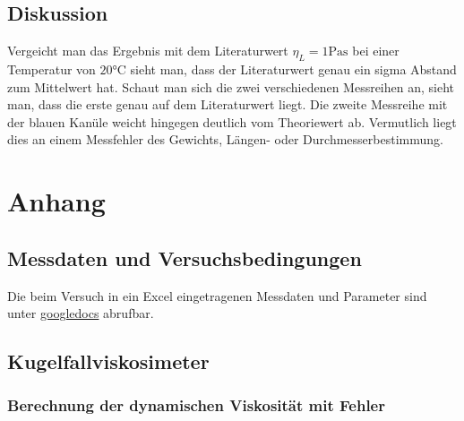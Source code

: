\documentclass[11pt, a4paper]{article}
\begin{document}
    \subsection{Diskussion}
    Vergeicht man das Ergebnis mit dem Literaturwert $\eta_L = 1 \si{\pascal\second}$ \cite[Abb. 8]{VIS} bei einer Temperatur
    von $20 \si{\celsius}$ sieht man, dass der Literaturwert genau ein sigma Abstand zum Mittelwert hat.
    Schaut man sich die zwei verschiedenen Messreihen an, sieht man, dass die erste genau auf dem Literaturwert
    liegt. Die zweite Messreihe mit der blauen Kanüle weicht hingegen deutlich vom Theoriewert ab.
    Vermutlich liegt dies an einem Messfehler des Gewichts, Längen-
    oder Durchmesserbestimmung. 



    \section{Anhang}
    \subsection{Messdaten und Versuchsbedingungen}

    Die beim Versuch in ein Excel eingetragenen Messdaten und Parameter sind unter \href{https://docs.google.com/spreadsheets/d/1p4tOhVyQVlxAsk8v-plbdhuA5Eo4l6K67Ajpn9mxlY4/edit?usp=sharing}{googledocs} abrufbar.

    \subsection{Kugelfallviskosimeter}

    \subsubsection{Berechnung der dynamischen Viskosität mit Fehler} \label{sec:dynvisc}
    
\end{document}
